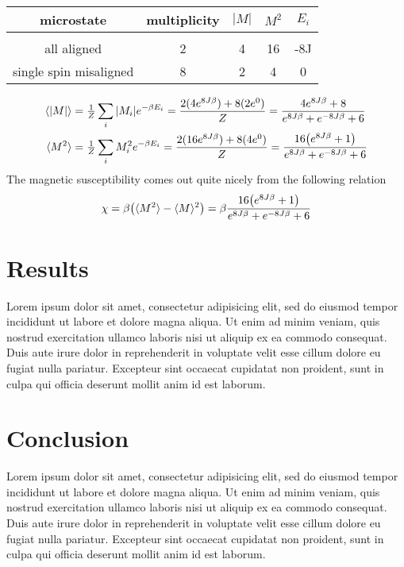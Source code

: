 \documentclass[a4paper, 12pt]{article}
\newcommand{\expect}[1]{\langle #1 \rangle}
\begin{document}
	\begin{center}
	\begin{tabular}{c c c c c}
		microstate	&	multiplicity	&	$|M|$	&	$M^2$ 	&	$E_i$\\
		\hline \\
		all aligned	&	2	&	4	&	16	&	-8J\\
		single spin misaligned & 8	&	2	&	4	&	0
	\end{tabular}
	\end{center}

	\begin{align*}
		\langle \abs{M} \rangle & = \tfrac{1}{Z} \sum_{i}\abs{M_i}e^{-\beta E_i} = \frac{2(4e^{8J\beta}) + 8(2e^{0})}{Z} = 
		\frac{4e^{8J\beta}+8}{e^{8J\beta}+e^{-8J\beta}+6}\\
		\langle M^2 \rangle & = \tfrac{1}{Z} \sum_{i}M_i^2e^{-\beta E_i} = \frac{2(16e^{8J\beta}) + 8(4e^{0})}{Z} = 
		\frac{16\qty(e^{8J\beta}+1)}{e^{8J\beta}+e^{-8J\beta}+6}\\
	\end{align*}
	The magnetic susceptibility comes out quite nicely from the following relation
	\begin{equation*}
		\chi = \beta \qty( \expect{M^2} - \expect{M}^2 ) = \beta \frac{16\qty(e^{8J\beta}+1)}{e^{8J\beta}+e^{-8J\beta}+6}
	\end{equation*}
	\newpage

\section{Results}
	Lorem ipsum dolor sit amet, consectetur adipisicing elit, sed do eiusmod
	tempor incididunt ut labore et dolore magna aliqua. Ut enim ad minim veniam,
	quis nostrud exercitation ullamco laboris nisi ut aliquip ex ea commodo
	consequat. Duis aute irure dolor in reprehenderit in voluptate velit esse
	cillum dolore eu fugiat nulla pariatur. Excepteur sint occaecat cupidatat non
	proident, sunt in culpa qui officia deserunt mollit anim id est laborum.

	\newpage

\section{Conclusion}
	Lorem ipsum dolor sit amet, consectetur adipisicing elit, sed do eiusmod
	tempor incididunt ut labore et dolore magna aliqua. Ut enim ad minim veniam,
	quis nostrud exercitation ullamco laboris nisi ut aliquip ex ea commodo
	consequat. Duis aute irure dolor in reprehenderit in voluptate velit esse
	cillum dolore eu fugiat nulla pariatur. Excepteur sint occaecat cupidatat non
	proident, sunt in culpa qui officia deserunt mollit anim id est laborum.
\end{document}
